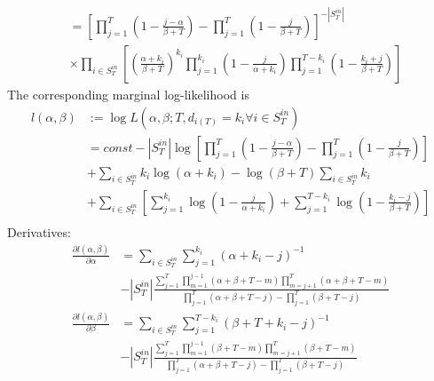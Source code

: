 \documentclass[a4paper, 12pt]{article}
\begin{document}
\begin{itemize}
\begin{align}
        &= \left[\prod_{j=1}^T \left(1 -\frac{j - \alpha}{\beta + T}\right) - \prod_{j=1}^T \left(1 - \frac{j}{\beta + T}\right)\right]^{-|S_T^{in}|} \nonumber \\
        &\times \prod_{i \in S_T^{in}} \left[\left(\frac{\alpha + k_i}{\beta + T}\right)^{k_i} \prod_{j=1}^{k_i}  \left(1 - \frac{j}{\alpha + k_i}\right) \prod_{j=1}^{T - k_i} \left(1 - \frac{k_i + j}{\beta + T}\right) \right]
    \end{align}
    The corresponding marginal log-likelihood is
    \begin{align}
        l(\alpha, \beta) &:= \log L(\alpha, \beta; T, d_{i(T)} = k_i \forall i \in S_T^{in}) \nonumber \\
        &= const - |S_T^{in}|\log\left[\prod_{j=1}^T (1 - \frac{j - \alpha}{\beta + T}) - \prod_{j=1}^T (1 - \frac{j}{\beta + T})\right] \nonumber \\
        &+ \sum_{i \in S_T^{in}} k_i\log(\alpha + k_i) - \log(\beta + T) \sum_{i \in S_T^{in}} k_i\nonumber \\
        &+ \sum_{i \in S_T^{in}} \left[\sum_{j = 1}^{k_i} \log(1 - \frac{j}{\alpha + k_i}) + \sum_{j = 1}^{T - k_i} \log(1 - \frac{k_i - j}{\beta + T})\right] \nonumber \\
    \end{align}
    Derivatives:
    \begin{align}
        \frac{\partial l(\alpha, \beta)}{\partial \alpha} &= \sum_{i \in S_T^{in}} \sum_{j = 1}^{k_i} (\alpha + k_i - j)^{-1} \nonumber \\
        &- |S_T^{in}|\frac{\sum_{j = 1}^T \prod_{m = 1}^{j - 1} (\alpha + \beta + T - m) \prod_{m = j + 1}^T (\alpha + \beta + T - m)}{\prod_{j=1}^T (\alpha + \beta + T - j) - \prod_{j=1}^T (\beta + T - j)}\\
        \frac{\partial l(\alpha, \beta)}{\partial \beta} &= \sum_{i \in S_T^{in}} \sum_{j = 1}^{T - k_i} (\beta + T + k_i - j)^{-1} \nonumber \\
        &- |S_T^{in}|\frac{\sum_{j = 1}^T \prod_{m = 1}^{j - 1} (\beta + T - m) \prod_{m = j + 1}^T (\beta + T - m)}{\prod_{j=1}^T (\alpha + \beta + T - j) - \prod_{j=1}^T (\beta + T - j)}
    \end{align}
\end{itemize}
\end{document}
